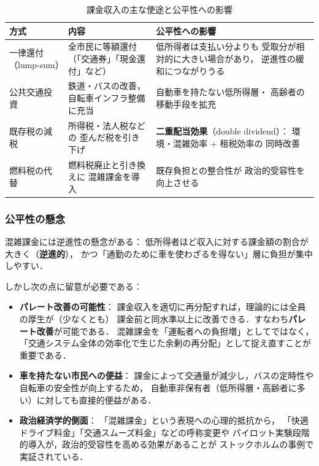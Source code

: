 \begin{table}[hbtp]
  \centering
  \caption{課金収入の主な使途と公平性への影響}
  \label{tab:revenue-use}
  \begin{tabular}{p{3.5cm}p{5.5cm}p{4.5cm}}
    \toprule
    方式 & 内容 & 公平性への影響 \\
    \midrule
    一律還付（lump-sum） &
      全市民に等額還付
      （「交通券」「現金還付」など） &
      低所得者は支払い分よりも
      受取分が相対的に大きい場合があり，
      逆進性の緩和につながりうる \\[4pt]
    公共交通投資 &
      鉄道・バスの改善，
      自転車インフラ整備に充当 &
      自動車を持たない低所得層・
      高齢者の移動手段を拡充 \\[4pt]
    既存税の減税 &
      所得税・法人税などの
      歪んだ税を引き下げ &
      \textbf{二重配当効果}（double dividend）：
      環境・混雑効率 + 租税効率の
      同時改善 \\[4pt]
    燃料税の代替 &
      燃料税廃止と引き換えに
      混雑課金を導入 &
      既存負担との整合性が
      政治的受容性を向上させる \\
    \bottomrule
  \end{tabular}
\end{table}

\subsubsection*{公平性の懸念}

混雑課金には逆進性の懸念がある：
低所得者ほど収入に対する課金額の割合が大きく（\textbf{逆進的}），
かつ「通勤のために車を使わざるを得ない」層に負担が集中しやすい\cite{Pigou1920}．

しかし次の点に留意が必要である：

\begin{itemize}
  \item
    \textbf{パレート改善の可能性}：
    課金収入を適切に再分配すれば，理論的には全員の厚生が（少なくとも）
    課金前と同水準以上に改善できる．すなわち\textbf{パレート改善}が可能である．
    混雑課金を「運転者への負担増」としてではなく，
    「交通システム全体の効率化で生じた余剰の再分配」として捉え直すことが重要である．

  \item
    \textbf{車を持たない市民への便益}：
    課金によって交通量が減少し，バスの定時性や自転車の安全性が向上するため，
    自動車非保有者（低所得層・高齢者に多い）に対しても直接的便益がある．

  \item
    \textbf{政治経済学的側面}：
    「混雑課金」という表現への心理的抵抗から，
    「快適ドライブ料金」「交通スムーズ料金」などの呼称変更や
    パイロット実験段階的導入が，政治的受容性を高める効果があることが
    ストックホルムの事例で実証されている\cite{Vickrey1969}．
\end{itemize}

